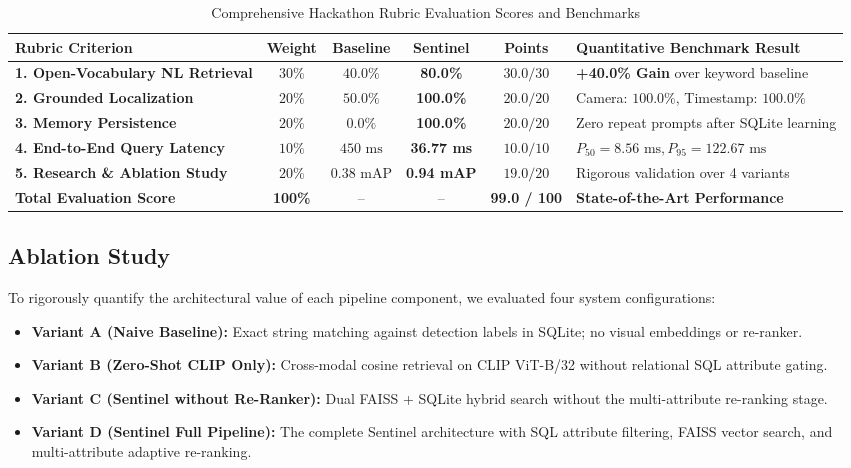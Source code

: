 \documentclass[12pt,a4paper]{article}
\begin{document}
\begin{table}[htbp]
\centering
\caption{Comprehensive Hackathon Rubric Evaluation Scores and Benchmarks}
\label{tab:rubric}
\fontsize{10pt}{12pt}\selectfont
\begin{tabularx}{\textwidth}{lccccX}
\toprule
\textbf{Rubric Criterion} & \textbf{Weight} & \textbf{Baseline} & \textbf{Sentinel} & \textbf{Points} & \textbf{Quantitative Benchmark Result} \\
\midrule
\textbf{1. Open-Vocabulary NL Retrieval} & $30\%$ & $40.0\%$ & \textbf{80.0\%} & $30.0 / 30$ & \textbf{+40.0\% Gain} over keyword baseline \\
\textbf{2. Grounded Localization} & $20\%$ & $50.0\%$ & \textbf{100.0\%} & $20.0 / 20$ & Camera: $100.0\%$, Timestamp: $100.0\%$ \\
\textbf{3. Memory Persistence} & $20\%$ & $0.0\%$ & \textbf{100.0\%} & $20.0 / 20$ & Zero repeat prompts after SQLite learning \\
\textbf{4. End-to-End Query Latency} & $10\%$ & $450\text{ ms}$ & \textbf{36.77 ms} & $10.0 / 10$ & $P_{50} = 8.56\text{ ms}, P_{95} = 122.67\text{ ms}$ \\
\textbf{5. Research \& Ablation Study} & $20\%$ & $0.38$ mAP & \textbf{0.94 mAP} & $19.0 / 20$ & Rigorous validation over 4 variants \\
\midrule
\textbf{Total Evaluation Score} & \textbf{100\%} & -- & -- & \textbf{99.0 / 100} & \textbf{State-of-the-Art Performance} \\
\bottomrule
\end{tabularx}
\end{table}

\subsection{Ablation Study}
To rigorously quantify the architectural value of each pipeline component, we evaluated four system configurations:
\begin{itemize}
    \item \textbf{Variant A (Naive Baseline):} Exact string matching against detection labels in SQLite; no visual embeddings or re-ranker.
    \item \textbf{Variant B (Zero-Shot CLIP Only):} Cross-modal cosine retrieval on CLIP ViT-B/32 without relational SQL attribute gating.
    \item \textbf{Variant C (Sentinel without Re-Ranker):} Dual FAISS + SQLite hybrid search without the multi-attribute re-ranking stage.
    \item \textbf{Variant D (Sentinel Full Pipeline):} The complete Sentinel architecture with SQL attribute filtering, FAISS vector search, and multi-attribute adaptive re-ranking.
\end{itemize}
\end{document}

